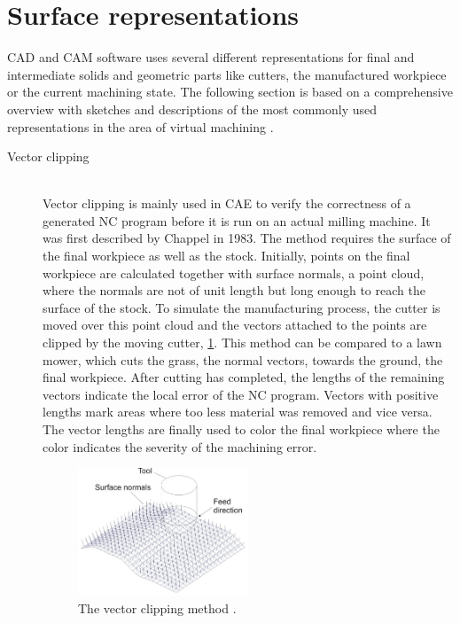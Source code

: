\section{Surface representations}
\label{sec:surface_representations}

CAD and CAM software uses several different representations for final and intermediate solids and geometric parts like cutters, the manufactured workpiece or the current machining state.
The following section is based on a comprehensive overview with sketches and descriptions of the most commonly used representations in the area of virtual machining \cite{virtual_machining_review}.

\begin{description}
	\item[Vector clipping] \hfill \\
	Vector clipping is mainly used in CAE to verify the correctness of a generated NC program before it is run on an actual milling machine.
	It was first described by Chappel \cite{vector_clipping} in 1983.
	The method requires the surface of the final workpiece as well as the stock.
	Initially, points on the final workpiece are calculated together with surface normals, \ie a point cloud, where the normals are not of unit length but long enough to reach the surface of the stock.
	To simulate the manufacturing process, the cutter is moved over this point cloud and the vectors attached to the points are clipped by the moving cutter, \cf \cref{fig:vector_clipping}.
	This method can be compared to a lawn mower, which cuts the grass, \ie the normal vectors, towards the ground, \ie the final workpiece.
	After cutting has completed, the lengths of the remaining vectors indicate the local error of the NC program.
	Vectors with positive lengths mark areas where too less material was removed and vice versa.
	The vector lengths are finally used to color the final workpiece where the color indicates the severity of the machining error.

	\begin{figure}[H]
		\centering
		\includegraphics[width=0.5\textwidth]{images/vector_clipping}
		\caption[Vector clipping]{
			The vector clipping method \cite{virtual_machining_review}.
		}
		\label{fig:vector_clipping}
	\end{figure}



\end{description}

